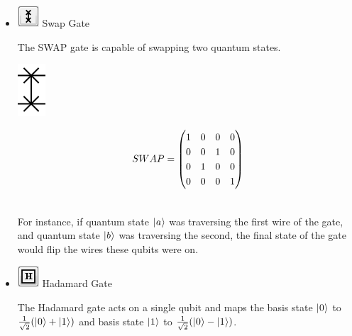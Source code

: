 \documentclass[10pt]{article}
\theoremstyle{definition}
\newcommand{\microspace}{\mspace{0.5mu}}
\def \lket {\left|}
\def \rket {\right\rangle}
\newcommand{\ket}[1]{\lket\microspace #1 \microspace\rket}
\begin{document}
\begin{itemize}
\item \includegraphics{Figures/Gates/SwapGate.png}  Swap Gate

The SWAP gate is capable of swapping two quantum states.

\begin{center}
\includegraphics[scale=.7]{Figures/Gates/SwapGateViewer} \\
  \begin{minipage}{.9\linewidth}
    \begin{equation*} \label{mat:Swap}
    \renewcommand{\arraystretch}{1.25}
SWAP = \begin{pmatrix} 1 & 0 & 0 & 0 \\ 0 & 0 & 1 & 0 \\ 0 & 1 & 0 & 0 \\ 0 & 0 & 0 & 1\end{pmatrix}
    \end{equation*}
  \end{minipage}\hspace{-2.5cm}
  \begin{minipage}{.2\linewidth}
  \vspace*{3pt}
    \begin{align}
    \end{align}
  \end{minipage}
\end{center}

For instance, if quantum state $\ket{a}$ was traversing the first wire of the gate, and quantum state $\ket{b}$ was traversing the second, the final state of the gate would flip the wires these qubits were on. 

\item \includegraphics{Figures/Gates/Hadamard.png}  Hadamard Gate

The Hadamard gate acts on a single qubit and maps the basis state $\ket{0}$ to $\frac{1}{\sqrt 2}(\ket{0} + \ket{1})$ and basis state $\ket{1}$ to $\frac{1}{\sqrt 2}(\ket{0} - \ket{1})$. 


\end{itemize}
\end{document}
